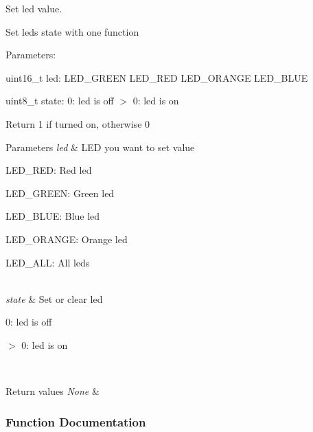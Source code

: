 Set led value. 

Set led\textquotesingle{}s state with one function

Parameters\+:
\begin{DoxyItemize}
\item uint16\+\_\+t led\+: L\+E\+D\+\_\+\+G\+R\+E\+E\+N L\+E\+D\+\_\+\+R\+E\+D L\+E\+D\+\_\+\+O\+R\+A\+N\+G\+E L\+E\+D\+\_\+\+B\+L\+U\+E
\end{DoxyItemize}

uint8\+\_\+t state\+: 0\+: led is off $>$ 0\+: led is on

Return 1 if turned on, otherwise 0 
\begin{DoxyParams}{Parameters}
{\em led} & L\+E\+D you want to set value
\begin{DoxyItemize}
\item L\+E\+D\+\_\+\+R\+E\+D\+: Red led
\item L\+E\+D\+\_\+\+G\+R\+E\+E\+N\+: Green led
\item L\+E\+D\+\_\+\+B\+L\+U\+E\+: Blue led
\item L\+E\+D\+\_\+\+O\+R\+A\+N\+G\+E\+: Orange led
\item L\+E\+D\+\_\+\+A\+L\+L\+: All leds 
\end{DoxyItemize}\\
\hline
{\em state} & Set or clear led
\begin{DoxyItemize}
\item 0\+: led is off
\item $>$ 0\+: led is on 
\end{DoxyItemize}\\
\hline
\end{DoxyParams}

\begin{DoxyRetVals}{Return values}
{\em None} & \\
\hline
\end{DoxyRetVals}


\subsubsection{Function Documentation}
\hypertarget{group___t_m___d_i_s_c_o___functions_gabe5d286b45c36b96b3eb4df0e5b9cfde}{}

